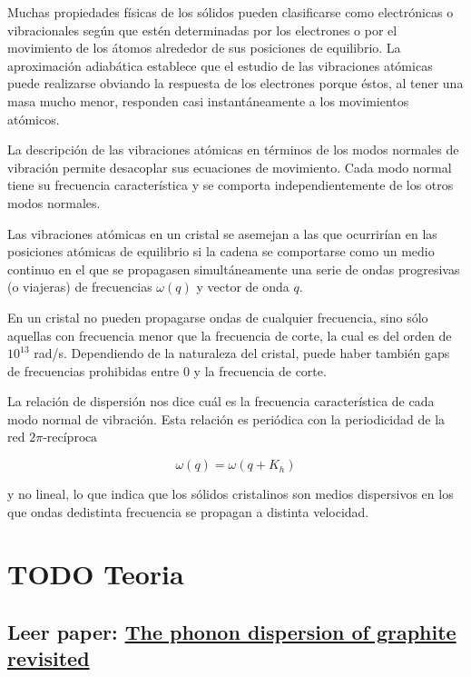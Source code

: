 \documentclass[11pt]{article}
\begin{document}
Muchas propiedades físicas de los sólidos pueden clasificarse como electrónicas o vibracionales según que estén determinadas por los electrones o por el movimiento de los átomos alrededor de sus posiciones de equilibrio.
La aproximación adiabática establece que el estudio de las vibraciones atómicas puede realizarse obviando la respuesta de los electrones porque éstos, al tener una masa mucho menor, responden casi instantáneamente a los movimientos atómicos.

La descripción de las vibraciones atómicas en términos de los modos normales de vibración permite desacoplar sus ecuaciones de movimiento. Cada modo normal tiene su frecuencia característica y se comporta independientemente de los otros modos normales.

Las vibraciones atómicas en un cristal se asemejan a las que ocurrirían en las posiciones atómicas de equilibrio si la cadena se comportarse como un medio continuo en el que se propagasen simultáneamente una serie de ondas progresivas (o viajeras) de frecuencias \(\omega(q)\) y vector de onda \(q\).

En un cristal no pueden propagarse ondas de cualquier frecuencia, sino sólo aquellas con frecuencia menor que la frecuencia de corte, la cual es del orden de \(10^{13}\) rad/s. Dependiendo de la naturaleza del cristal, puede haber también gaps de frecuencias prohibidas entre 0 y la frecuencia de corte.

La relación de dispersión nos dice cuál es la frecuencia característica de cada modo normal de vibración. Esta relación es periódica con la periodicidad de la red \(2\pi\text{-recíproca}\)

\begin{equation*}
\omega(q)=\omega(q+K_h)
\end{equation*}

y no lineal, lo que indica que los sólidos cristalinos son medios dispersivos en los que ondas dedistinta frecuencia se propagan a distinta velocidad.



\section{{\bfseries\sffamily TODO} Teoria}
\label{sec:org4380863}
\subsection{Leer paper: \href{wirtz2004.pdf}{The phonon dispersion of graphite revisited}}
\label{sec:org238f702}
\end{document}
